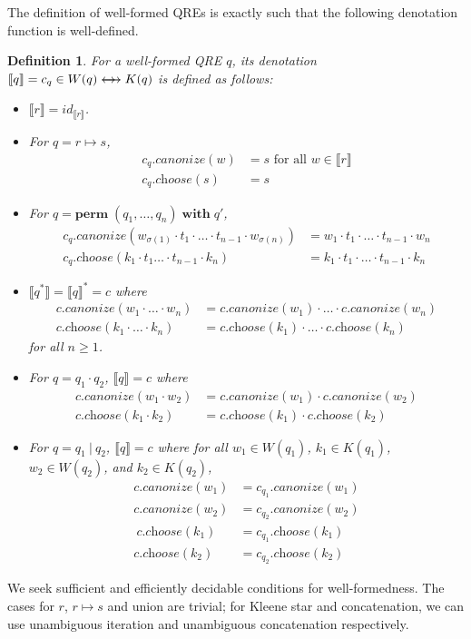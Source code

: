 \documentclass[a4paper,11pt] {article}
\theoremstyle{plain}
\newtheorem{definition}[theorem]{Definition}
\newcommand{\negjoinrel}{\mathrel{\mkern3mu}}
\newcommand{\rlaprel}[1]{\mathrel{\mathrlap{#1}}}
\newcommand{\lcanonize}[1]{\textit{$#1$.canonize}}
\newcommand{\lchoose}[1]{\textit{$#1$.choose}}
\newcommand{\canon}{\rlaprel{\longleftarrow}\rlaprel{\longrightarrow}
  \negjoinrel\rightarrow\;\,}
\newcommand{\perm}{ \textbf{perm}\; }
\newcommand{\with}{ \;\textbf{with}\; }
\begin{document}
The definition of well-formed QREs is exactly such that the following
denotation function is well-defined.
\begin{definition}
  For a well-formed QRE $q$, its denotation
  $\llbracket q \rrbracket = c_q \in W(q) \canon K(q)$ is defined as follows:
  \begin{itemize}
  \item $\llbracket r \rrbracket = \mathit{id}_{\llbracket r \rrbracket}$.
  \item For $q = r \mapsto s$, 
    \begin{align*}
      \lcanonize{c_q}(w) &= s \text{ for all
        $w \in \llbracket r \rrbracket$} \\
      \lchoose{c_q}(s) &= s
    \end{align*}
  \item For $q = \perm(q_1, \ldots, q_n) \with q'$, 
    \begin{align*}
      \lcanonize{c_q}(w_{\sigma(1)} \cdot t_1 \cdot \ldots \cdot t_{n-1}
      \cdot w_{\sigma(n)}) &= w_1 \cdot t_1 \cdot \ldots \cdot t_{n-1} \cdot w_n \\
      \lchoose{c_q}(k_1 \cdot t_1 \ldots \cdot t_{n-1} \cdot k_n)
      &= k_1 \cdot t_1 \cdot \ldots \cdot t_{n-1} \cdot k_n
    \end{align*}
  \item $\llbracket q^* \rrbracket = \llbracket q \rrbracket^* = c$ where 
    \begin{align*}
      \lcanonize{c}(w_1 \cdot \ldots \cdot w_n) &=
      \lcanonize{c}(w_1) \cdot \ldots \cdot \lcanonize{c}(w_n) \\
      \lchoose{c}(k_1 \cdot \ldots \cdot k_n) &=
      \lchoose{c}(k_1) \cdot \ldots \cdot \lchoose{c}(k_n)
    \end{align*}
    for all $n \geq 1$.
  \item For $q = q_1 \cdot q_2$, $\llbracket q \rrbracket = c$ where 
    \begin{align*}
      \lcanonize{c}(w_1 \cdot w_2) &=
      \lcanonize{c}(w_1) \cdot \lcanonize{c}(w_2) \\
      \lchoose{c}(k_1 \cdot k_2) &=
      \lchoose{c}(k_1) \cdot \lchoose{c}(k_2)
    \end{align*}
  \item For $q = q_1 ~|~ q_2$, $\llbracket q \rrbracket = c$ where
    for all $w_1 \in W(q_1)$, $k_1 \in K(q_1)$, $w_2 \in W(q_2)$,
    and $k_2 \in K(q_2)$,
    \begin{align*}
      \lcanonize{c}(w_1) &=
      \lcanonize{c_{q_1}}(w_1) \\
      \lcanonize{c}(w_2) &=
      \lcanonize{c_{q_2}}(w_2) \\
      \
      \lchoose{c}(k_1) &=
      \lchoose{c_{q_1}}(k_1) \\      
      \lchoose{c}(k_2) &=
      \lchoose{c_{q_2}}(k_2)
    \end{align*}
  \end{itemize}  
\end{definition}
We seek sufficient and efficiently decidable conditions for
well-formedness. The cases for $r$, $r \mapsto s$ and union are trivial;
for Kleene star and concatenation, we can use unambiguous iteration
and unambiguous concatenation respectively. 
\end{document}
